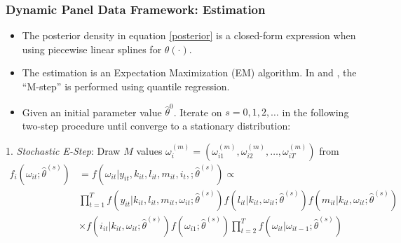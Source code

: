 \documentclass{beamer}
\begin{document}
\begin{frame}
\frametitle{Dynamic Panel Data Framework: Estimation}
\begin{itemize}
	\item The posterior density in equation \eqref{posterior} is a closed-form expression when using piecewise linear splines for $\theta(\cdot)$. 
	\item The estimation is an Expectation Maximization (EM) algorithm. In \cite{Arellano2016} and \cite{Arellano2017}, the ``M-step'' is performed using quantile regression. 
	\item Given an initial parameter value $\hat{\theta}^{0}$. Iterate on $s=0,1,2,\dots$ in the following two-step procedure until converge to a stationary distribution:
\end{itemize}
1. \textit{Stochastic E-Step}: Draw $M$ values $\omega_{i}^{(m)}=(\omega_{i1}^{(m)}, \omega_{i2}^{(m)},\dots, \omega_{iT}^{(m)})$ from
\small
        \begin{equation*}
        \begin{split}
            f_{i}(\omega_{it};\hat{\theta}^{(s)})&=f(\omega_{it}|y_{it}, k_{it}, l_{it}, m_{it}, i_{t},; \hat{\theta}^{(s)}) \propto\\
            &\prod_{t=1}^{T}f(y_{it}|k_{it}, l_{it}, m_{it}, \omega_{it};\hat{\theta}^{(s)})f(l_{it}|k_{it}, \omega_{it};\hat{\theta}^{(s)})f(m_{it}|k_{it}, \omega_{it};\hat{\theta}^{(s)}) \\
            &\times f(i_{it}|k_{it}, \omega_{it};\hat{\theta}^{(s)})f(\omega_{i1};\hat{\theta}^{(s)})\prod_{t=2}^{T}f(\omega_{it}|\omega_{it-1};\hat{\theta}^{(s)})
            \end{split}
        \end{equation*}
\end{frame}

\end{document}

